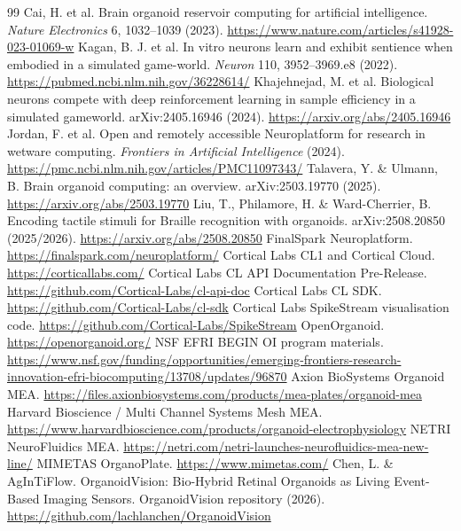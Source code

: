 \documentclass[10pt,twocolumn]{article}
\begin{document}
\begin{thebibliography}{99}
 Cai, H. et al. Brain organoid reservoir computing for artificial intelligence. \emph{Nature Electronics} 6, 1032--1039 (2023). \url{https://www.nature.com/articles/s41928-023-01069-w}
 Kagan, B. J. et al. In vitro neurons learn and exhibit sentience when embodied in a simulated game-world. \emph{Neuron} 110, 3952--3969.e8 (2022). \url{https://pubmed.ncbi.nlm.nih.gov/36228614/}
 Khajehnejad, M. et al. Biological neurons compete with deep reinforcement learning in sample efficiency in a simulated gameworld. arXiv:2405.16946 (2024). \url{https://arxiv.org/abs/2405.16946}
 Jordan, F. et al. Open and remotely accessible Neuroplatform for research in wetware computing. \emph{Frontiers in Artificial Intelligence} (2024). \url{https://pmc.ncbi.nlm.nih.gov/articles/PMC11097343/}
 Talavera, Y. \& Ulmann, B. Brain organoid computing: an overview. arXiv:2503.19770 (2025). \url{https://arxiv.org/abs/2503.19770}
 Liu, T., Philamore, H. \& Ward-Cherrier, B. Encoding tactile stimuli for Braille recognition with organoids. arXiv:2508.20850 (2025/2026). \url{https://arxiv.org/abs/2508.20850}
 FinalSpark Neuroplatform. \url{https://finalspark.com/neuroplatform/}
 Cortical Labs CL1 and Cortical Cloud. \url{https://corticallabs.com/}
 Cortical Labs CL API Documentation Pre-Release. \url{https://github.com/Cortical-Labs/cl-api-doc}
 Cortical Labs CL SDK. \url{https://github.com/Cortical-Labs/cl-sdk}
 Cortical Labs SpikeStream visualisation code. \url{https://github.com/Cortical-Labs/SpikeStream}
 OpenOrganoid. \url{https://openorganoid.org/}
 NSF EFRI BEGIN OI program materials. \url{https://www.nsf.gov/funding/opportunities/emerging-frontiers-research-innovation-efri-biocomputing/13708/updates/96870}
 Axion BioSystems Organoid MEA. \url{https://files.axionbiosystems.com/products/mea-plates/organoid-mea}
 Harvard Bioscience / Multi Channel Systems Mesh MEA. \url{https://www.harvardbioscience.com/products/organoid-electrophysiology}
 NETRI NeuroFluidics MEA. \url{https://netri.com/netri-launches-neurofluidics-mea-new-line/}
 MIMETAS OrganoPlate. \url{https://www.mimetas.com/}
 Chen, L. \& AgInTiFlow. OrganoidVision: Bio-Hybrid Retinal Organoids as Living Event-Based Imaging Sensors. OrganoidVision repository (2026). \url{https://github.com/lachlanchen/OrganoidVision}

\end{thebibliography}
\end{document}
